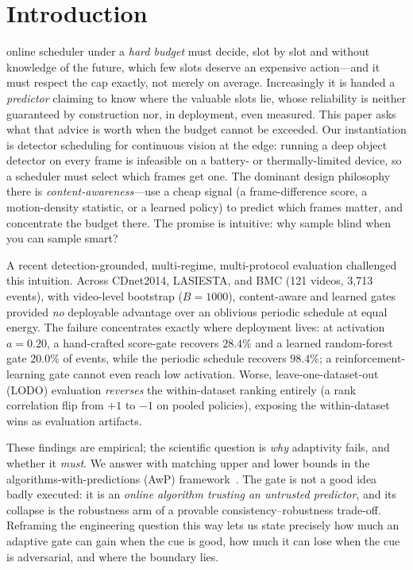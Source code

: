 ﻿\documentclass[lettersize,journal]{IEEEtran}
\begin{document}
\section{Introduction}
 online scheduler under a \emph{hard budget} must decide, slot by slot and without knowledge of the future, which few slots deserve an expensive action---and it must respect the cap exactly, not merely on average. Increasingly it is handed a \emph{predictor} claiming to know where the valuable slots lie, whose reliability is neither guaranteed by construction nor, in deployment, even measured. This paper asks what that advice is worth when the budget cannot be exceeded. Our instantiation is detector scheduling for continuous vision at the edge: running a deep object detector on every frame is infeasible on a battery- or thermally-limited device, so a scheduler must select which frames get one. The dominant design philosophy there is \emph{content-awareness}---use a cheap signal (a frame-difference score, a motion-density statistic, or a learned policy) to predict which frames matter, and concentrate the budget there. The promise is intuitive: why sample blind when you can sample smart?

A recent detection-grounded, multi-regime, multi-protocol evaluation challenged this intuition. Across CDnet2014, LASIESTA, and BMC (121 videos, 3{,}713 events), with video-level bootstrap ($B=1000$), content-aware and learned gates provided \emph{no} deployable advantage over an oblivious periodic schedule at equal energy. The failure concentrates exactly where deployment lives: at activation $a=0.20$, a hand-crafted score-gate recovers $28.4\%$ and a learned random-forest gate $20.0\%$ of events, while the periodic schedule recovers $98.4\%$; a reinforcement-learning gate cannot even reach low activation. Worse, leave-one-dataset-out (LODO) evaluation \emph{reverses} the within-dataset ranking entirely (a rank correlation flip from $+1$ to $-1$ on pooled policies), exposing the within-dataset wins as evaluation artifacts.

These findings are empirical; the scientific question is \emph{why} adaptivity fails, and whether it \emph{must}. We answer with matching upper and lower bounds in the algorithms-with-predictions (AwP) framework~\cite{lv,purohit,mv}. The gate is not a good idea badly executed: it is an \emph{online algorithm trusting an untrusted predictor}, and its collapse is the robustness arm of a provable consistency--robustness trade-off. Reframing the engineering question this way lets us state precisely how much an adaptive gate can gain when the cue is good, how much it can lose when the cue is adversarial, and where the boundary lies.
\end{document}
